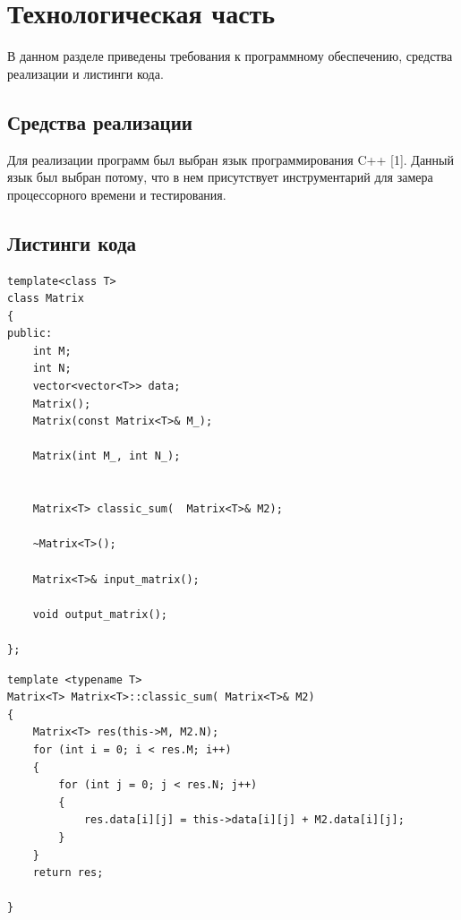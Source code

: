 \section{Технологическая часть}

В данном разделе приведены требования к программному обеспечению, средства реализации и листинги кода.



\subsection{Средства реализации}


Для реализации программ был выбран язык программирования C++ [1]. Данный язык был выбран потому, что в нем присутствует инструментарий для замера процессорного времени и тестирования.

\subsection{Листинги кода}
\begin{lstlisting}[caption=Описание класса Matrix, label=list:canon, language={}]
template<class T>
class Matrix
{
public:
	int M;
	int N;
	vector<vector<T>> data;
	Matrix();
	Matrix(const Matrix<T>& M_);

	Matrix(int M_, int N_);


	Matrix<T> classic_sum(  Matrix<T>& M2);

	~Matrix<T>();

	Matrix<T>& input_matrix();

	void output_matrix();

};
\end{lstlisting}

\begin{lstlisting}[caption=Алгоритм простого сложения матриц, label=list:canon, language={}]
template <typename T>
Matrix<T> Matrix<T>::classic_sum( Matrix<T>& M2)
{
	Matrix<T> res(this->M, M2.N);
	for (int i = 0; i < res.M; i++)
	{
		for (int j = 0; j < res.N; j++)
		{
			res.data[i][j] = this->data[i][j] + M2.data[i][j];
		}
	}
	return res;

}
\end{lstlisting}

